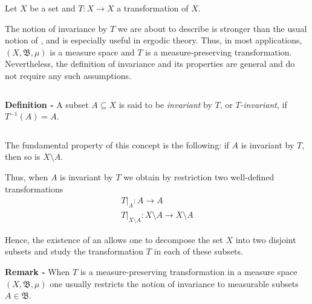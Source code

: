 \documentclass[12pt]{article}
\begin{document}

Let $X$ be a set and $T:X \longrightarrow X$ a transformation of $X$.

The notion of invariance by $T$ we are about to describe is stronger than the usual notion of , and is especially useful in ergodic theory. Thus, in most applications, $(X, \mathfrak{B}, \mu)$ is a measure space and $T$ is a measure-preserving transformation. Nevertheless, the definition of invariance and its properties are general and do not require any such assumptions.

$\,$

{\bf Definition -} A subset $A \subseteq X$ is said to be \emph{invariant} by $T$, or $T$-\emph{invariant}, if $T^{-1}(A)=A$.

$\,$

The fundamental property of this concept is the following: if $A$ is invariant by $T$, then so is $X \setminus A$.

Thus, when $A$ is invariant by $T$ we obtain by restriction two well-defined transformations
\begin{align*}
T|_A :A \longrightarrow A\\
T|_{X\setminus A} : X\setminus A \longrightarrow X\setminus A
\end{align*}

Hence, the existence of an  allows one to decompose the set $X$ into two disjoint subsets and study the transformation $T$ in each of these subsets.

{\bf Remark -} When $T$ is a measure-preserving transformation in a measure space $(X, \mathfrak{B}, \mu)$ one usually restricts the notion of invariance to measurable subsets $A \in \mathfrak{B}$.
\end{document}
